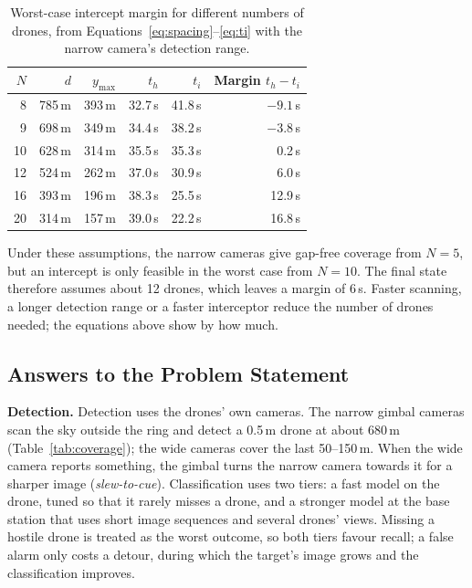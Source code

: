 \documentclass{article}
\begin{document}
\begin{table}[H]
\centering
\small
\begin{tabular}{|r|r|r|r|r|r|}
\hline
$N$ & $d$ & $y_{\max}$ & $t_h$ & $t_i$ & Margin $t_h - t_i$ \\
\hline
8  & 785\,m & 393\,m & 32.7\,s & 41.8\,s & $-9.1$\,s \\
9  & 698\,m & 349\,m & 34.4\,s & 38.2\,s & $-3.8$\,s \\
10 & 628\,m & 314\,m & 35.5\,s & 35.3\,s & 0.2\,s \\
12 & 524\,m & 262\,m & 37.0\,s & 30.9\,s & 6.0\,s \\
16 & 393\,m & 196\,m & 38.3\,s & 25.5\,s & 12.9\,s \\
20 & 314\,m & 157\,m & 39.0\,s & 22.2\,s & 16.8\,s \\
\hline
\end{tabular}
\caption{Worst-case intercept margin for different numbers of drones, from
Equations~\eqref{eq:spacing}--\eqref{eq:ti} with the narrow camera's detection
range.}
\label{tab:feasibility}
\end{table}

Under these assumptions, the narrow cameras give gap-free coverage from
$N = 5$, but an intercept is only feasible in the worst case from $N = 10$.
The final state therefore assumes about 12 drones, which leaves a margin of
6\,s. Faster scanning, a longer detection range or a faster interceptor reduce
the number of drones needed; the equations above show by how much.

\subsection{Answers to the Problem Statement}

\textbf{Detection.} Detection uses the drones' own cameras. The narrow gimbal
cameras scan the sky outside the ring and detect a 0.5\,m drone at about
680\,m (Table~\ref{tab:coverage}); the wide cameras cover the last 50--150\,m.
When the wide camera reports something, the gimbal turns the narrow camera
towards it for a sharper image (\emph{slew-to-cue}). Classification uses two
tiers: a fast model on the drone, tuned so that it rarely misses a drone, and
a stronger model at the base station that uses short image sequences and
several drones' views. Missing a hostile drone is treated as the worst
outcome, so both tiers favour recall; a false alarm only costs a detour,
during which the target's image grows and the classification improves.
\end{document}
